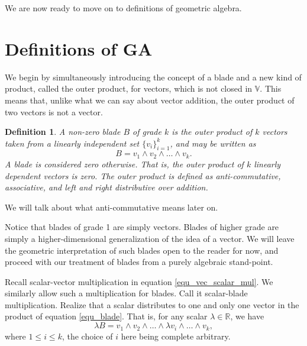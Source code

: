 \documentclass[12pt]{article}
\newcommand{\V}{\mathbb{V}}
\newcommand{\R}{\mathbb{R}}
\newtheorem{definition}{Definition}[section]
\begin{document}
We are now ready to move on to definitions of geometric algebra.

\section{Definitions of GA}

We begin by simultaneously introducing the concept of a blade and a new kind of
product, called the outer product, for vectors, which is not closed in $\V$.  This means
that, unlike what we can say about vector addition, the outer product of two vectors is not a vector.
\begin{definition}\label{def_blade}
A non-zero blade $B$ of grade $k$ is the outer product of $k$ vectors taken
from a linearly independent set $\{v_i\}_{i=1}^k$, and may be written as
\begin{equation}\label{equ_blade}
B = v_1\wedge v_2\wedge\dots\wedge v_k.
\end{equation}
A blade is considered zero otherwise.  That is, the outer product of $k$
linearly dependent vectors is zero.  The outer product is defined as
anti-commutative, associative, and left and right distributive over addition.
\end{definition}

We will talk about what anti-commutative means later on.

Notice that blades of grade 1 are simply vectors.  Blades of higher grade are simply
a higher-dimensional generalization of the idea of a vector.  We will leave the geometric
interpretation of such blades open to the reader for now, and proceed with our treatment of
blades from a purely algebraic stand-point.

Recall scalar-vector multiplication in equation \eqref{equ_vec_scalar_mul}.
We similarly allow such a multiplication for blades.  Call it scalar-blade multiplication.
Realize that a scalar distributes to one and only one vector in the product of
equation \eqref{equ_blade}.  That is, for any scalar $\lambda\in\R$,
we have
\begin{equation}
\lambda B = v_1\wedge v_2\wedge\dots\wedge \lambda v_i\wedge\dots\wedge v_k,
\end{equation}
where $1\leq i\leq k$, the choice of $i$ here being complete arbitrary.
\end{document}
